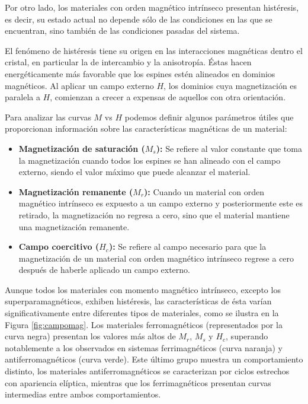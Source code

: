 \documentclass[../main.tex]{subfiles}
\begin{document}
Por otro lado, los materiales con orden magnético intrínseco presentan histéresis, es decir, su estado actual no depende sólo de las condiciones en las que se encuentran, sino también de las condiciones pasadas del sistema.

El fenómeno de histéresis tiene su origen en las interacciones magnéticas dentro el cristal, en particular la de intercambio y la anisotropía. Éstas hacen energéticamente más favorable que los espines estén alineados en dominios magnéticos. Al aplicar un campo externo $H$, los dominios cuya magnetización es paralela a $H$, comienzan a crecer a expensas de aquellos con otra orientación.

Para analizar las curvas $M$ vs $H$ podemos definir algunos parámetros útiles que proporcionan información sobre las características magnéticas de un material:

\begin{itemize}
    \item \textbf{Magnetización de saturación ($M_s$):} Se refiere al valor constante que toma la magnetización cuando todos los espines se han alineado con el campo externo, siendo el valor máximo que puede alcanzar el material.
    \item \textbf{Magnetización remanente ($M_r$):} Cuando un material con orden magnético intrínseco es expuesto a un campo externo y posteriormente este es retirado, la magnetización no regresa a cero, sino que el material mantiene una magnetización remanente.
    \item \textbf{Campo coercitivo ($H_c$):} Se refiere al campo necesario para que la magnetización de un material con orden magnético intrínseco regrese a cero después de haberle aplicado un campo externo.
\end{itemize}
Aunque todos los materiales con momento magnético intrínseco, excepto los superparamagnéticos, exhiben histéresis, las características de ésta varían significativamente entre diferentes tipos de materiales, como se ilustra en la Figura \ref{fig:campomag}. Los materiales ferromagnéticos (representados por la curva negra) presentan los valores más altos de $M_r$, $M_s$ y $H_c$, superando notablemente a los observados en sistemas ferrimagnéticos (curva naranja) y antiferromagnéticos (curva verde). Este último grupo muestra un comportamiento distinto, los materiales antiferromagnéticos se caracterizan por ciclos estrechos con apariencia elíptica, mientras que los ferrimagnéticos presentan curvas intermedias entre ambos comportamientos.
\end{document}
